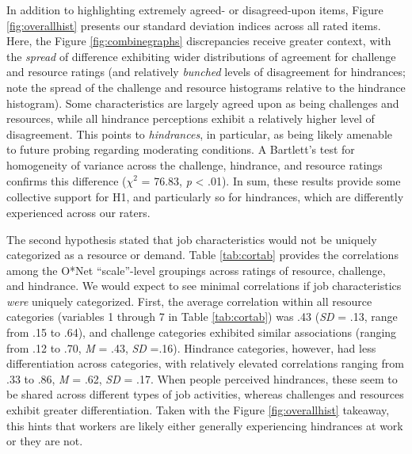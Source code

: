 \documentclass[
  english,
  man]{apa6}
\begin{document}
In addition to highlighting extremely agreed- or disagreed-upon items, Figure \ref{fig:overallhist} presents our standard deviation indices across all rated items. Here, the Figure \ref{fig:combinegraphs} discrepancies receive greater context, with the \emph{spread} of difference exhibiting wider distributions of agreement for challenge and resource ratings (and relatively \emph{bunched} levels of disagreement for hindrances; note the spread of the challenge and resource histograms relative to the hindrance histogram). Some characteristics are largely agreed upon as being challenges and resources, while all hindrance perceptions exhibit a relatively higher level of disagreement. This points to \emph{hindrances}, in particular, as being likely amenable to future probing regarding moderating conditions. A Bartlett's test for homogeneity of variance across the challenge, hindrance, and resource ratings confirms this difference (\(\chi^2_{}\) = 76.83, \emph{p} \textless{} .01). In sum, these results provide some collective support for H1, and particularly so for hindrances, which are differently experienced across our raters.

The second hypothesis stated that job characteristics would not be uniquely categorized as a resource or demand. Table \ref{tab:cortab} provides the correlations among the O*Net ``scale''-level groupings across ratings of resource, challenge, and hindrance. We would expect to see minimal correlations if job characteristics \emph{were} uniquely categorized. First, the average correlation within all resource categories (variables 1 through 7 in Table \ref{tab:cortab}) was .43 (\emph{SD} = .13, range from .15 to .64), and challenge categories exhibited similar associations (ranging from .12 to .70, \emph{M} = .43, \emph{SD} =.16). Hindrance categories, however, had less differentiation across categories, with relatively elevated correlations ranging from .33 to .86, \emph{M} = .62, \emph{SD} = .17. When people perceived hindrances, these seem to be shared across different types of job activities, whereas challenges and resources exhibit greater differentiation. Taken with the Figure \ref{fig:overallhist} takeaway, this hints that workers are likely either generally experiencing hindrances at work or they are not.
\end{document}
